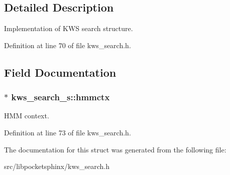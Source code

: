 \subsection{Detailed Description}
Implementation of K\-W\-S search structure. 

Definition at line 70 of file kws\-\_\-search.\-h.



\subsection{Field Documentation}
\subsubsection[{hmmctx}]{$\ast$ kws\-\_\-search\-\_\-s\-::hmmctx}\label{structkws__search__s_a0069d57702f921cbd1e2093148e7b672}


H\-M\-M context. 



Definition at line 73 of file kws\-\_\-search.\-h.



The documentation for this struct was generated from the following file\-:\begin{DoxyCompactItemize}
\item 
src/libpocketsphinx/kws\-\_\-search.\-h\end{DoxyCompactItemize}
